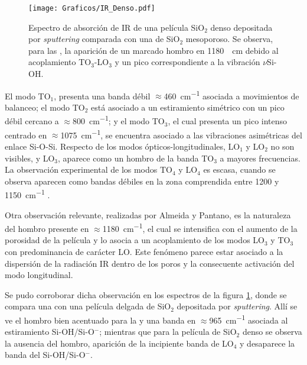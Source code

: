 		 	 \begin{figure}[!ht]
						\begin{center}
						\texttt{[image: Graficos/IR\_Denso.pdf]}
						\caption[FTIR SiO$_2$ denso y SiO$_2$ mesoporoso.]{Espectro de absorción de IR de una película SiO$_2$ denso depositada por \textit{sputtering }comparada con una de SiO$_2$ mesoporoso. Se observa, para las \pdm, la aparición de un marcado hombro en \SI{1180}{\per\cm} debido al acoplamiento TO$_3$-LO$_3$ y un pico correspondiente a la vibración $\nu$Si-OH.}
						\label{fig:IR-denso}
						\end{center}
						\end{figure}

		 El modo TO$_1$, presenta una banda débil $\approx$\SI{460}{\cm^{-1}} asociada a movimientos de balanceo; el modo TO$_2$ está asociado a un estiramiento simétrico con un pico débil cercano a $\approx$\SI{800}{\cm^{-1}}; y el modo TO$_3$, el cual presenta un pico intenso centrado en $\approx$\SI{1075}{\cm^{-1}}, se encuentra asociado a las vibraciones asimétricas del enlace Si-O-Si. Respecto de los modos ópticos-longitudinales, LO$_1$ y LO$_2$ no son visibles, y LO$_3$, aparece como un hombro de la banda TO$_3$ a mayores frecuencias. La observación experimental de los modos TO$_4$ y LO$_4$ es escasa, cuando se observa aparecen como bandas débiles en la zona comprendida entre 1200 y \SI{1150}{\cm^{-1}} \cite{Pai1986,Grosse1986}.
				 	
		 Otra observación relevante, realizadas por Almeida y Pantano\cite{Almeida1990}, es la naturaleza del hombro presente en $\approx$\SI{1180}{\cm^{-1}}, el cual se intensifica con el aumento de la porosidad de la película y lo asocia a un acoplamiento de los modos LO$_3$ y TO$_3$ con predominancia de carácter LO. Este fenómeno parece estar asociado a la dispersión de la radiación IR dentro de los poros y la consecuente activación del modo longitudinal.	
			
		 Se pudo corroborar dicha observación en los espectros de la figura \ref{fig:IR-denso}, donde se compara una \pdm\space con una película delgada de SiO$_2$ depositada por \textit{sputtering}.  Allí se ve el hombro bien acentuado para la \pdm\space y una banda en $\approx$\SI{965}{\cm^{-1}} asociada al estiramiento Si-OH/Si-O$^-$; mientras que para la película de SiO$_2$ denso se observa la ausencia del hombro, aparición de la incipiente banda de LO$_4$ y desaparece la banda del Si-OH/Si-O$^-$.

